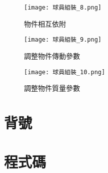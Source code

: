 \begin{figure}[h]
  \begin{center}
    \texttt{[image: 球員組裝\_8.png]}
  \end{center}
  \caption{物件相互依附}
  \label{fig:photo}
\end{figure}
\begin{figure}[h]
  \begin{center}
    \texttt{[image: 球員組裝\_9.png]}
  \end{center}
  \caption{調整物件傳動參數}
  \label{fig:photo}
\end{figure}
\begin{figure}[h]
  \begin{center}
    \texttt{[image: 球員組裝\_10.png]}
  \end{center}
  \caption{調整物件質量參數}
  \label{fig:photo}
\end{figure}
\newpage
\section{背號}

\section{程式碼}
